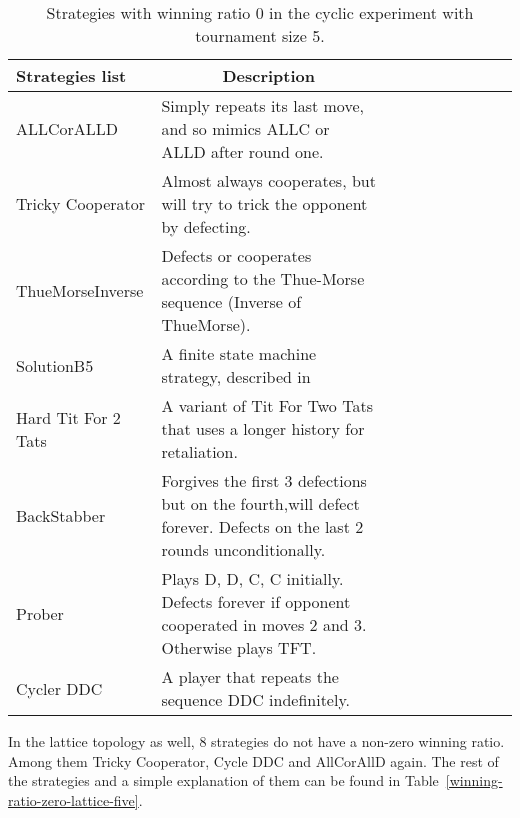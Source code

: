 \begin{table}[h]
	\centering
	\begin{adjustbox}{width=1\textwidth}
		\small
		\begin{tabular}{@{}|l|l|l|l|l|l|l|l|l|l|@{}}
			\hline
			Strategies list     & \multicolumn{1}{c|}{Description}                                                                                     \\ \hline
			ALLCorALLD          & Simply repeats its last move, and so mimics ALLC or ALLD after round one.                                            \\ \hline
			Tricky Cooperator   & Almost always cooperates, but will try to trick the opponent by defecting.                                           \\ \hline
			ThueMorseInverse    & Defects or cooperates according to the Thue-Morse sequence (Inverse of ThueMorse).                                   \\ \hline
			SolutionB5          & A finite state machine strategy, described in~\cite{Ashlock2015}                               \\ \hline
			Hard Tit For 2 Tats & A variant of Tit For Two Tats that uses a longer history for retaliation.                                            \\ \hline
			BackStabber         & Forgives the first 3 defections but on the fourth,will defect forever. Defects on the last 2 rounds unconditionally. \\ \hline
			Prober              & Plays D, D, C, C initially. Defects forever if opponent cooperated in moves 2 and 3. Otherwise plays TFT.            \\ \hline
			Cycler DDC          & A player that repeats the sequence DDC indefinitely.                                                                 \\ \hline
		\end{tabular}
	\end{adjustbox}
	\caption{Strategies with winning ratio 0 in the cyclic experiment with tournament
	size 5.}
	\label{winning-ratio-zero-cyclic-five}
\end{table}

In the lattice topology as well, 8 strategies do not have a non-zero winning ratio.
Among them Tricky Cooperator, Cycle DDC and AllCorAllD again. The rest of the
strategies and a simple explanation of them can be found in Table~\ref{winning-ratio-zero-lattice-five}.

